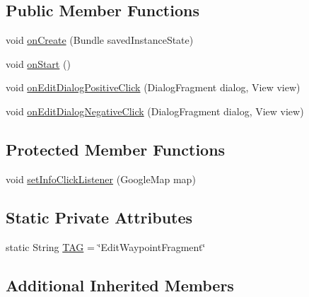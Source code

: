 \subsection*{Public Member Functions}
\begin{DoxyCompactItemize}
\item 
void \hyperlink{classuk_1_1ac_1_1swan_1_1digitaltrails_1_1fragments_1_1_edit_waypoint_map_fragment_a4611b7f39b7ad67461b7491c0db72af1}{on\+Create} (Bundle saved\+Instance\+State)
\item 
void \hyperlink{classuk_1_1ac_1_1swan_1_1digitaltrails_1_1fragments_1_1_edit_waypoint_map_fragment_a98b6b4265368d7bf79748f5c51614c4b}{on\+Start} ()
\item 
void \hyperlink{classuk_1_1ac_1_1swan_1_1digitaltrails_1_1fragments_1_1_edit_waypoint_map_fragment_a22db35994fe05c0010ff3a0a6a5bb0a2}{on\+Edit\+Dialog\+Positive\+Click} (Dialog\+Fragment dialog, View view)
\item 
void \hyperlink{classuk_1_1ac_1_1swan_1_1digitaltrails_1_1fragments_1_1_edit_waypoint_map_fragment_a6565a840b337650094b0d9e82f5f20d6}{on\+Edit\+Dialog\+Negative\+Click} (Dialog\+Fragment dialog, View view)
\end{DoxyCompactItemize}
\subsection*{Protected Member Functions}
\begin{DoxyCompactItemize}
\item 
void \hyperlink{classuk_1_1ac_1_1swan_1_1digitaltrails_1_1fragments_1_1_edit_waypoint_map_fragment_a048c0f0d6318c8399dd98cfa58e83fb6}{set\+Info\+Click\+Listener} (Google\+Map map)
\end{DoxyCompactItemize}
\subsection*{Static Private Attributes}
\begin{DoxyCompactItemize}
\item 
static String \hyperlink{classuk_1_1ac_1_1swan_1_1digitaltrails_1_1fragments_1_1_edit_waypoint_map_fragment_a509156cbfb92d25de0fbac3095043506}{T\+A\+G} = \char`\"{}Edit\+Waypoint\+Fragment\char`\"{}
\end{DoxyCompactItemize}
\subsection*{Additional Inherited Members}


